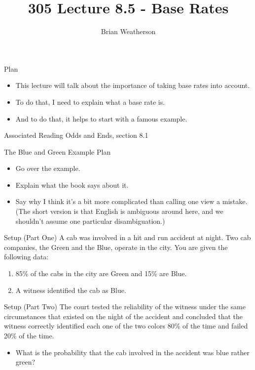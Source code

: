\documentclass[
  ignorenonframetext,
]{beamer}
\title{305 Lecture 8.5 - Base Rates}
\author{Brian Weatherson}
\date{}
\providecommand{\tightlist}{%
  \setlength{\itemsep}{0pt}\setlength{\parskip}{0pt}}
\renewcommand{\,}{\text{, }}
\begin{document}
\frame{\titlepage}

\begin{frame}{Plan}
\protect\hypertarget{plan}{}
\begin{itemize}
\tightlist
\item
  This lecture will talk about the importance of taking base rates into
  account.
\item
  To do that, I need to explain what a base rate is.
\item
  And to do that, it helps to start with a famous example.
\end{itemize}
\end{frame}

\begin{frame}{Associated Reading}
\protect\hypertarget{associated-reading}{}
Odds and Ends, section 8.1
\end{frame}

\begin{frame}{The Blue and Green Example}
\protect\hypertarget{the-blue-and-green-example}{}
Plan

\begin{itemize}
\tightlist
\item
  Go over the example.
\item
  Explain what the book says about it.
\item
  Say why I think it's a bit more complicated than calling one view a
  mistake. (The short version is that English is ambiguous around here,
  and we shouldn't assume one particular disambiguation.)
\end{itemize}
\end{frame}

\begin{frame}{Setup (Part One)}
\protect\hypertarget{setup-part-one}{}
A cab was involved in a hit and run accident at night. Two cab
companies, the Green and the Blue, operate in the city. You are given
the following data:

\begin{enumerate}
\tightlist
\item
  85\% of the cabs in the city are Green and 15\% are Blue.
\item
  A witness identified the cab as Blue.
\end{enumerate}
\end{frame}

\begin{frame}{Setup (Part Two)}
\protect\hypertarget{setup-part-two}{}
The court tested the reliability of the witness under the same
circumstances that existed on the night of the accident and concluded
that the witness correctly identified each one of the two colors 80\% of
the time and failed 20\% of the time.

\begin{itemize}
\tightlist
\item
  What is the probability that the cab involved in the accident was blue
  rather green?
\end{itemize}
\end{frame}
\end{document}
